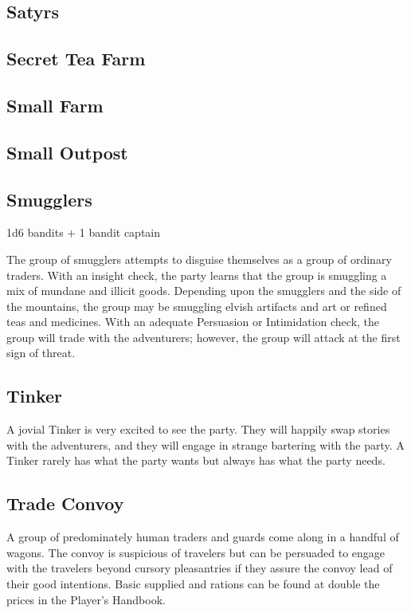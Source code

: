 \subsection{Satyrs}

\subsection{Secret Tea Farm}

\subsection{Small Farm}

\subsection{Small Outpost}

\subsection{Smugglers}

1d6 bandits + 1 bandit captain

The group of smugglers attempts to disguise themselves as a group of ordinary traders.
With an insight check, the party learns that the group is smuggling a mix of mundane and illicit goods.
Depending upon the smugglers and the side of the mountains, the group may be smuggling elvish artifacts and art or refined teas and medicines.
With an adequate Persuasion or Intimidation check, the group will trade with the adventurers; however, the group will attack at the first sign of threat.

\subsection{Tinker}

A jovial Tinker is very excited to see the party.
They will happily swap stories with the adventurers, and they will engage in strange bartering with the party.
A Tinker rarely has what the party wants but always has what the party needs.

\subsection{Trade Convoy}

A group of predominately human traders and guards come along in a handful of wagons.
The convoy is suspicious of travelers but can be persuaded to engage with the travelers beyond cursory pleasantries if they assure the convoy lead of their good intentions.
Basic supplied and rations can be found at double the prices in the Player's Handbook.

